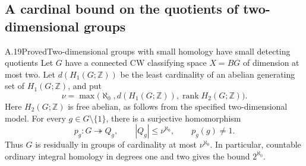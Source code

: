\subsection{A cardinal bound on the quotients of two-dimensional groups}

\begin{claim}{A.19}{Proved}{Two-dimensional groups with small homology have small detecting quotients}
Let $G$ have a connected CW classifying space $X=BG$ of dimension
at most two. Let $d(H_1(G;\mathbb Z))$ be the least cardinality of
an abelian generating set of $H_1(G;\mathbb Z)$, and put
\[
 \nu=\max\bigl(\aleph_0,d(H_1(G;\mathbb Z)),
                    \operatorname{rank}H_2(G;\mathbb Z)\bigr).
 \tag{A.19.1}
\]
Here $H_2(G;\mathbb Z)$ is free abelian, as follows from the
specified two-dimensional model. For every $g\in G\setminus\{1\}$,
there is a surjective homomorphism
\[
 p_g:G\twoheadrightarrow Q_g,
 \qquad |Q_g|\leq\nu^{\aleph_0},\qquad p_g(g)\ne1.
 \tag{A.19.2}
\]
Thus $G$ is residually in groups of cardinality at most
$\nu^{\aleph_0}$. In particular, countable ordinary integral
homology in degrees one and two gives the bound $2^{\aleph_0}$.
\end{claim}

